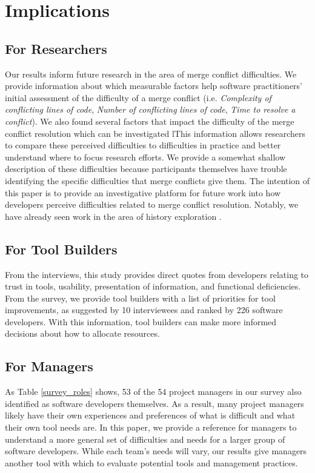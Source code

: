 \section{Implications}\label{implications}
\subsection{For Researchers}
Our results inform future research in the area of merge conflict difficulties.
We provide information about which measurable factors help software practitioners' initial assessment of the difficulty of a merge conflict (i.e. \textit{Complexity of conflicting lines of code}, \textit{Number of conflicting lines of code}, \textit{Time to resolve a conflict}). We also found several factors that impact the difficulty of the merge conflict resolution which can be investigated lThis information allows researchers to compare these perceived difficulties to difficulties in practice and better understand where to focus research efforts. We provide a somewhat shallow description of these difficulties because participants themselves have trouble identifying the specific difficulties that merge conflicts give them. 
The intention of this paper is to provide an investigative platform for future work into how developers perceive difficulties related to merge conflict resolution. Notably, we have already seen work in the area of history exploration \cite{mihai_lenses}.
\subsection{For Tool Builders}
From the interviews, this study provides direct quotes from developers relating to trust in tools, usability, presentation of information, and functional deficiencies. From the survey, we provide tool builders with a list of priorities for tool improvements, as suggested by 10 interviewees and ranked by 226 software developers. With this information, tool builders can make more informed decisions about how to allocate resources.
\subsection{For Managers}
As Table \ref{survey_roles} shows, 53 of the 54 project managers in our survey also identified as software developers themselves. As a result, many project managers likely have their own experiences and preferences of what is difficult and what their own tool needs are. In this paper, we provide a reference for managers to understand a more general set of difficulties and needs for a larger group of software developers. While each team's needs will vary, our results give managers another tool with which to evaluate potential tools and management practices.